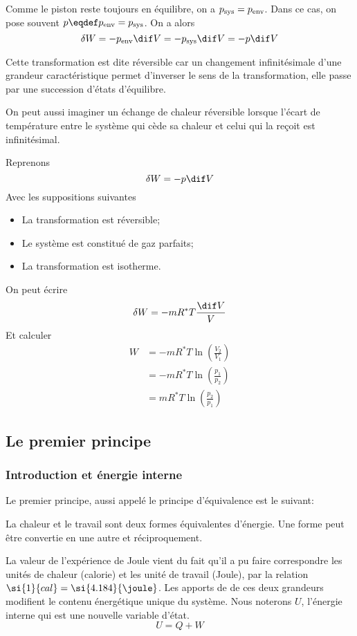 Comme le piston reste toujours en équilibre, on a $p_{\mathrm{sys}} = p_{\mathrm{env}}$.
Dans ce cas, on pose souvent $p \eqdef \penv = \psys$.
On a alors
\[ \delta W = -\penv \dif V = -\psys \dif V = -p \dif V \]

Cette transformation est dite réversible car un changement infinitésimale
d'une grandeur caractéristique permet d'inverser le sens de la transformation,
elle passe par une succession d'états d'équilibre.

On peut aussi imaginer un échange de chaleur réversible lorsque
l'écart de température entre le système qui cède sa chaleur et
celui qui la reçoit est infinitésimal.

Reprenons
\[ \delta W = -p\dif V \]
Avec les suppositions suivantes
\begin{itemize}
  \item La transformation est réversible;
  \item Le système est constitué de gaz parfaits;
  \item La transformation est isotherme.
\end{itemize}
On peut écrire
\[ \delta W = -mR^*T\frac{\dif V}V \]
Et calculer
\begin{align*}
  W & = -mR^*T \ln\left(\frac{V_2}{V_1}\right)\\
    & = -mR^*T \ln\left(\frac{p_1}{p_2}\right)\\
    & = mR^*T \ln\left(\frac{p_2}{p_1}\right)
\end{align*}

\subsection{Le premier principe}
\subsubsection{Introduction et énergie interne}
Le premier principe, aussi appelé le principe d'équivalence est le suivant:

La chaleur et le travail sont deux formes équivalentes d'énergie.
Une forme peut être convertie en une autre et réciproquement.

La valeur de l'expérience de Joule vient du fait qu'il a pu
faire correspondre les unités de chaleur (calorie) et
les unité de travail (Joule), par la relation
$\si{1}{cal} = \si{4.184}{\joule}$.
Les apports de de ces deux grandeurs modifient
le contenu énergétique unique du système.
Nous noterons $U$, l'énergie interne qui est une nouvelle variable d'état.
\[ U = Q + W \]


